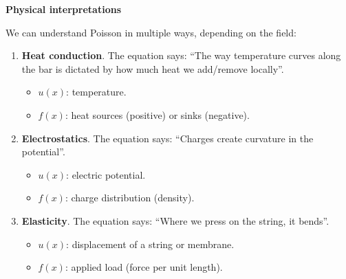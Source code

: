 \highspace
\begin{flushleft}
    \textcolor{Green3}{ \textbf{Physical interpretations}}
\end{flushleft}
We can understand Poisson in multiple ways, depending on the field:
\begin{enumerate}
    \item \textbf{Heat conduction}. The equation says: ``The way temperature curves along the bar is dictated by how much heat we add/remove locally''.
    \begin{itemize}
        \item $u(x)$: temperature.
        \item $f(x)$: heat sources (positive) or sinks (negative).
    \end{itemize}
    \item \textbf{Electrostatics}. The equation says: ``Charges create curvature in the potential''.
    \begin{itemize}
        \item $u(x)$: electric potential.
        \item $f(x)$: charge distribution (density).
    \end{itemize}
    \item \textbf{Elasticity}. The equation says: ``Where we press on the string, it bends''.
    \begin{itemize}
        \item $u(x)$: displacement of a string or membrane.
        \item $f(x)$: applied load (force per unit length).
    \end{itemize}
\end{enumerate}

\newpage

